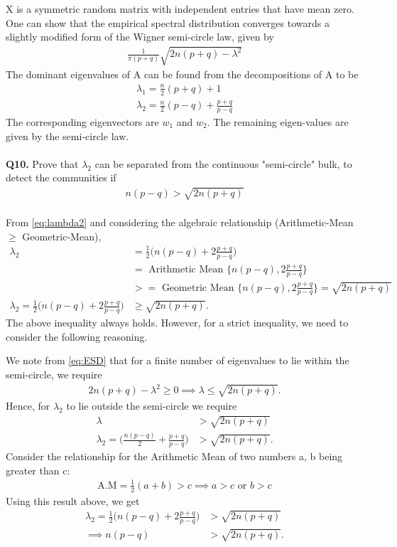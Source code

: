 \documentclass[9pt]{article}
\begin{document}
X is a symmetric random matrix with independent entries that have mean zero. One can show that the empirical spectral distribution converges towards a slightly modified form of the Wigner semi-circle law, given by
\begin{align}
\frac{1}{\pi(p + q)} \sqrt{2n(p+q) - \lambda^2} \label{eq:ESD}
\end{align}
The dominant eigenvalues of A can be found from the decompositions of A to be
\begin{align}
\lambda_1 = \frac{n}{2}(p+q) + 1 \label{eq:lambda1}\\
\lambda_2 = \frac{n}{2}(p-q) + \frac{p+q}{p-q} \label{eq:lambda2}
\end{align}
The corresponding eigenvectors are $w_1$ and $w_2$. The remaining eigen-values are given by the semi-circle law.\\
\\
\textbf{Q10. } Prove that $\lambda_2$ can be separated from the continuous "semi-circle" bulk, to detect the communities  if 
\begin{align}
n(p-q) > \sqrt{2n(p+q)}
\end{align}\\

From \eqref{eq:lambda2} and considering the algebraic relationship (Arithmetic-Mean $\geq$ Geometric-Mean), 
 \begin{align*}
 \lambda_2 &= \frac{1}{2} \bigg(n(p-q) + 2\frac{p+q}{p-q}\bigg) \\
 &= \text{ Arithmetic Mean } \{ n(p-q),  2\frac{p+q}{p-q}\}\\
 &>= \text{ Geometric Mean } \{ n(p-q),  2\frac{p+q}{p-q}\} = \sqrt{2n(p+q)}\\
 \lambda_2 = \frac{1}{2} \bigg(n(p-q) + 2\frac{p+q}{p-q}\bigg) &\geq \sqrt{2n(p+q)}.
 \end{align*}
The above inequality always holds. However, for a strict inequality, we need to consider the following reasoning. 
 
 We note from \eqref{eq:ESD} that for a finite number of eigenvalues to lie within the semi-circle, we require 
 \begin{align}
2n(p+q) - \lambda^2 \geq 0 \implies \lambda \leq \sqrt{2n(p+q)}.
 \end{align}
 Hence, for $\lambda_2$ to lie outside the semi-circle we require
 \begin{align*}
 \lambda &> \sqrt{2n(p+q)}\\
 \lambda_2 = \bigg( \frac{n(p-q)}{2} + \frac{p+q}{p-q} \bigg) &> \sqrt{2n(p+q)}.
 \end{align*}
Consider the relationship for the Arithmetic Mean of two numbers a, b being greater than c:
\begin{align*}
\text{A.M} = \frac{1}{2}(a + b) > c \implies a>c \text{ or } b>c 
\end{align*}
Using this result above, we get
\begin{align*}
 \lambda_2 = \frac{1}{2} \bigg( n(p-q) + 2\frac{p+q}{p-q} \bigg) &> \sqrt{2n(p+q)}\\
 \implies n(p-q) &> \sqrt{2n(p+q)}.
\end{align*}
\end{document}
